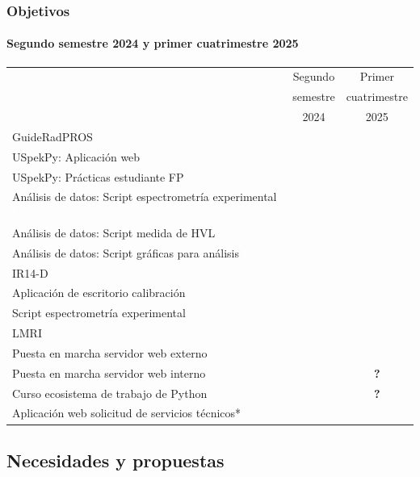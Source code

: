 \documentclass{beamer}
\newcommand{\done}{{\color{green}\ding{52}}}
\newcommand{\todo}{{\color{red}\ding{56}}}
\newcommand{\doing}{{\color{orange}\ding{229}}}
\newcommand{\focus}{{\colorbox{red!30}{\textcolor{white}{\textbf{\tiny !}}}}}
\begin{document}
	\begin{frame}
		\frametitle{Objetivos}
		\framesubtitle{Segundo semestre 2024 y primer cuatrimestre 2025}
		\centering
		\scriptsize
		\begin{tabular}{lcc}
			&Segundo&Primer\\
			&semestre&cuatrimestre\\
			&2024&2025\\
			\rowcolor{blue!40}
			{\color{white}GuideRadPROS}&&\\
			USpekPy: Aplicación web&\doing&\doing\\
			USpekPy: Prácticas estudiante FP&\done&\\
			Análisis de datos: Script espectrometría experimental \focus &\done&\\
			Análisis de datos: Script medida de HVL \focus &&\todo\\
			Análisis de datos: Script gráficas para análisis \focus &&\todo\\
			\rowcolor{blue!40}
			{\color{white}IR14-D}&&\\
			Aplicación de escritorio calibración&\doing&\doing\\
			Script espectrometría experimental&\done&\\
			\rowcolor{blue!40}
			{\color{white}LMRI}&&\\
			Puesta en marcha servidor web externo&\doing&\doing\\
			Puesta en marcha servidor web interno&\doing&\textbf{?}\\
			Curso ecosistema de trabajo de Python&\todo&\textbf{?}\\
			Aplicación web solicitud de servicios técnicos*&\doing&\doing\\
		\end{tabular}
	\end{frame}
	
	\subsection{Necesidades y propuestas}
	
\end{document}
